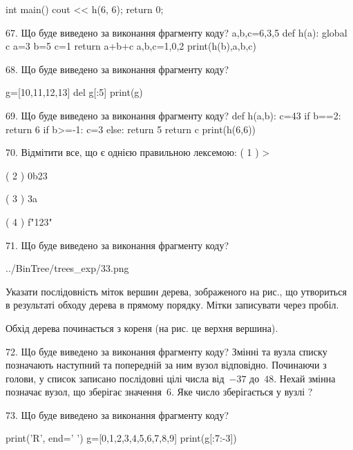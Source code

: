 \documentclass[11pt]{article}
\begin{document}
int main(){
    cout << h(6, 6);
    return 0;
}


67. Що буде виведено за виконання фрагменту коду?
a,b,c=6,3,5
   def h(a):
     global c     a=3
     b=5
     c=1
     return a+b+c
   a,b,c=1,0,2
   print(h(b),a,b,c)

68. Що буде виведено за виконання фрагменту коду?

g=[10,11,12,13]
del g[:5]
print(g)



69. Що буде виведено за виконання фрагменту коду?
def h(a,b):
      c=43
      if b==2: return 6
      if b>=-1: c=3
      else: return 5
      return c
   print(h(6,6))

70. %
Відмітити все, що є однією правильною лексемою:
( 1 ) >

( 2 ) 0b23

( 3 ) 3a

( 4 ) f"123"


71. Що буде виведено за виконання фрагменту коду?

\begin{center}
	{../BinTree/trees_exp/33.png}
\end{center}
Указати послідовність міток вершин дерева, зображеного на рис., що утвориться в результаті обходу дерева в прямому порядку. Мітки записувати через пробіл.\par Обхід дерева починається з кореня (на рис. це верхня вершина).


72. Що буде виведено за виконання фрагменту коду?
Змінні  та  вузла списку позначають наступний та попередній за ним вузол відповідно. Починаючи з голови, у список записано послідовні цілі числа від~$-37$ до~$48$. Нехай змінна  позначає вузол, що зберігає значення~$6$.
Яке число зберігається у вузлі  ?


73. Що буде виведено за виконання фрагменту коду?

print('R', end=' ')
g=[0,1,2,3,4,5,6,7,8,9]
print(g[:7:-3])


\end{document}
